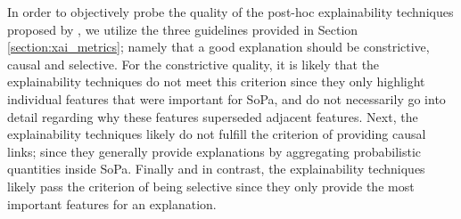 In order to objectively probe the quality of the post-hoc explainability
techniques proposed by \citet{schwartz2018sopa}, we utilize the three guidelines
provided in Section \ref{section:xai_metrics}; namely that a good explanation
should be constrictive, causal and selective. For the constrictive quality, it
is likely that the explainability techniques do not meet this criterion since they
only highlight individual features that were important for SoPa, and do not
necessarily go into detail regarding why these features superseded adjacent
features. Next, the explainability techniques likely do not fulfill the criterion
of providing causal links; since they generally provide explanations by
aggregating probabilistic quantities inside SoPa. Finally and in
contrast, the explainability techniques likely pass the criterion of being
selective since they only provide the most important features for an
explanation.


